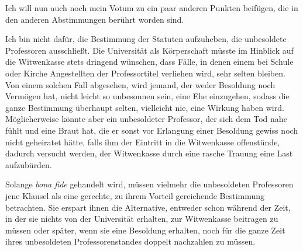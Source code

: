 Ich will nun auch noch mein Votum zu ein paar anderen Punkten beifügen, die in den anderen Abstimmungen berührt worden sind.

Ich bin nicht dafür, die Bestimmung der Statuten aufzuheben, die unbesoldete Professoren ausschließt. Die Universität als Körperschaft müsste im Hinblick auf die Witwenkasse stets dringend wünschen, dass Fälle, in denen einem bei Schule oder Kirche Angestellten der Professortitel verliehen wird, sehr selten bleiben. Von einem solchen Fall abgesehen, wird jemand, der weder Besoldung noch Vermögen hat, nicht leicht so unbesonnen sein, eine Ehe einzugehen, sodass die ganze Bestimmung überhaupt selten, vielleicht nie, eine Wirkung haben wird. Möglicherweise könnte aber ein unbesoldeter Professor, der sich dem Tod nahe fühlt und eine Braut hat, die er sonst vor Erlangung einer Besoldung gewiss noch nicht geheiratet hätte, falls ihm der Eintritt in die Witwenkasse offenstünde, dadurch versucht werden, der Witwenkasse durch eine rasche Trauung eine Last aufzubürden.

Solange \textit{bona fide} gehandelt wird, müssen vielmehr die unbesoldeten Professoren jene Klausel als
eine gerechte, zu ihrem Vorteil gereichende Bestimmung betrachten. Sie erspart ihnen die Alternative, entweder schon während der Zeit, in der sie nichts von der Universität erhalten, zur Witwenkasse beitragen zu müssen oder später, wenn sie eine Besoldung erhalten, noch für die ganze Zeit ihres unbesoldeten Professorenstandes doppelt nachzahlen zu müssen.

